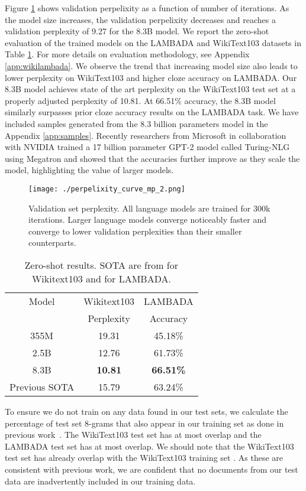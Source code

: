 \documentclass{article}
\begin{document}
Figure \ref{fig:ppl_curve} shows validation perpelixity as a function of number of iterations. As the model size increases, the validation perpelixity decreases and reaches  a validation perplexity of 9.27 for the 8.3B model. We report the zero-shot evaluation of the trained models on the LAMBADA and WikiText103 datasets in Table \ref{tab:model_results}. For more details on evaluation methodology, see Appendix \ref{app:wikilambada}. We observe the trend that increasing model size also leads to lower perplexity on WikiText103 and higher cloze accuracy on LAMBADA. Our 8.3B model achieves state of the art perplexity on the WikiText103 test set at a properly adjusted perplexity of 10.81. At 66.51\% accuracy, the 8.3B model similarly surpasses prior cloze accuracy results on the LAMBADA task. We have included samples generated from the 8.3 billion parameters model in the Appendix \ref{app:samples}. Recently researchers from Microsoft in collaboration with NVIDIA trained a 17 billion parameter GPT-2 model called Turing-NLG \cite{TNLG} using Megatron and showed that the accuracies further improve as they scale the model, highlighting the value of larger models. 

\begin{figure}
\begin{center}
 \texttt{[image: ./perpelixity\_curve\_mp\_2.png]}
 \caption{Validation set perplexity. All language models are trained for 300k iterations. Larger language models converge noticeably faster and converge to lower validation perplexities than their smaller counterparts.}
 \label{fig:ppl_curve}
\end{center}
\end{figure}

\begin{table}
\begin{center}
\caption{Zero-shot results. SOTA are from \cite{WIKI103SOTA} for Wikitext103 and \cite{Radford2019GPT2} for LAMBADA.}
\label{tab:model_results}
\begin{tabular}{c|c|c} \hline \hline
Model & Wikitext103 & LAMBADA   \\
 & Perplexity  & Accuracy   \\ \hline
355M & 19.31 & 45.18\%  \\ 
2.5B & 12.76 & 61.73\%  \\ 
8.3B & \textbf{10.81} & \textbf{66.51\%}  \\ \hline 
Previous SOTA & 15.79 & 63.24\% \\
\end{tabular}
\end{center}
\end{table}
To ensure we do not train on any data found in our test sets, we calculate the percentage of test set 8-grams that also appear in our training set as done in previous work~\cite{Radford2019GPT2}. The WikiText103 test set has at most  overlap and the LAMBADA test set \citep{lambada} has at most  overlap. We should note that the WikiText103 test set has already  overlap with the WikiText103 training set \cite{Radford2019GPT2}. As these are consistent with previous work, 
we are confident that no documents from our test data are inadvertently included in our training data.
\end{document}
